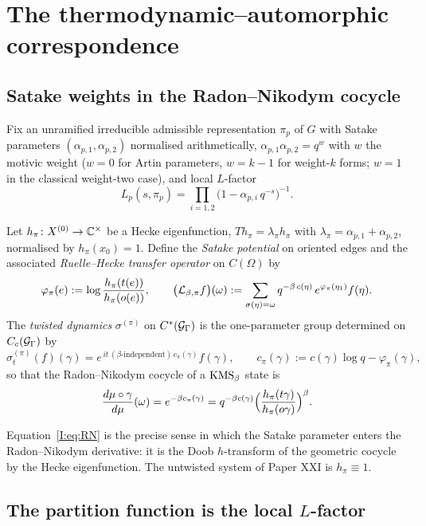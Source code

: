 \section{The thermodynamic--automorphic correspondence}\label{I:sec:thermo}

\subsection{Satake weights in the Radon--Nikodym cocycle}

Fix an unramified irreducible admissible representation $\pi_p$ of $G$ with Satake
parameters $(\alpha_{p,1},\alpha_{p,2})$ normalised arithmetically,
$\alpha_{p,1}\alpha_{p,2}=q^{w}$ with $w$ the motivic weight ($w=0$ for Artin
parameters, $w=k-1$ for weight-$k$ forms; $w=1$ in the classical weight-two case), and
local $L$-factor
\[
L_p(s,\pi_p)=\prod_{i=1,2}\bigl(1-\alpha_{p,i}\,q^{-s}\bigr)^{-1}.
\]

\begin{definition}\label{I:def:dynamics}
Let $h_\pi\colon X^{(0)}\to\mathbb{C}^\times$ be a Hecke eigenfunction, $T h_\pi=\lambda_\pi h_\pi$
with $\lambda_\pi=\alpha_{p,1}+\alpha_{p,2}$, normalised by $h_\pi(x_0)=1$. Define the
\emph{Satake potential} on oriented edges and the associated \emph{Ruelle--Hecke transfer
operator} on $C(\Omega)$ by
\[
\varphi_\pi(e):=\log\frac{h_\pi(t(e))}{h_\pi(o(e))},\qquad
\bigl(\mathcal{L}_{\beta,\pi}f\bigr)(\omega):=\sum_{\sigma(\eta)=\omega}
q^{-\beta\,c(\eta)}\,e^{\varphi_\pi(\eta_1)}f(\eta).
\]
The \emph{twisted dynamics} $\sigma^{(\pi)}$ on $C^*(\mathcal{G}_\Gamma)$ is the one-parameter
group determined on $C_c(\mathcal{G}_\Gamma)$ by
\[
\sigma^{(\pi)}_t(f)(\gamma)=e^{\,it\,(\beta\text{-independent})\,c_\pi(\gamma)}f(\gamma),
\qquad
c_\pi(\gamma):=c(\gamma)\log q-\varphi_\pi(\gamma),
\]
so that the Radon--Nikodym cocycle of a $\mathrm{KMS}_\beta$ state is
\begin{equation}\label{I:eq:RN}
\frac{d\mu\circ\gamma}{d\mu}(\omega)=e^{-\beta c_\pi(\gamma)}
=q^{-\beta c(\gamma)}\Bigl(\frac{h_\pi(t\gamma)}{h_\pi(o\gamma)}\Bigr)^{\beta}.
\end{equation}
\end{definition}

Equation~\eqref{I:eq:RN} is the precise sense in which the Satake parameter enters the
Radon--Nikodym derivative: it is the Doob $h$-transform of the geometric cocycle by the
Hecke eigenfunction. The untwisted system of Paper XXI is $h_\pi\equiv1$.

\subsection{The partition function is the local \texorpdfstring{$L$}{L}-factor}

